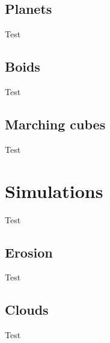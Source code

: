\subsection{Planets}

Test

\subsection{Boids}

Test

\subsection{Marching cubes}

Test

\section{Simulations}

Test

\subsection{Erosion}

Test

\subsection{Clouds}

Test